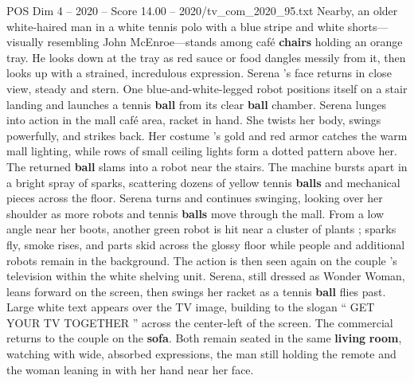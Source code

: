 \begin{textsample}{POS Dim 4 – 2020 – Score 14.00 – 2020/tv\_com\_2020\_95.txt}
Nearby, an older white-haired man in a white tennis polo with a blue stripe and white shorts—visually resembling John McEnroe—stands among café \textbf{chairs} holding an orange tray.
He looks down at the tray as red sauce or food dangles messily from it, then looks up with a strained, incredulous expression.
Serena ’s face returns in close view, steady and stern.
One blue-and-white-legged robot positions itself on a stair landing and launches a tennis \textbf{ball} from its clear \textbf{ball} chamber.
Serena lunges into action in the mall café area, racket in hand.
She twists her body, swings powerfully, and strikes back.
Her costume ’s gold and red armor catches the warm mall lighting, while rows of small ceiling lights form a dotted pattern above her.
The returned \textbf{ball} slams into a robot near the stairs.
The machine bursts apart in a bright spray of sparks, scattering dozens of yellow tennis \textbf{balls} and mechanical pieces across the floor.
Serena turns and continues swinging, looking over her shoulder as more robots and tennis \textbf{balls} move through the mall.
From a low angle near her boots, another green robot is hit near a cluster of plants ; sparks fly, smoke rises, and parts skid across the glossy floor while people and additional robots remain in the background.
The action is then seen again on the couple ’s television within the white shelving unit.
Serena, still dressed as Wonder Woman, leans forward on the screen, then swings her racket as a tennis \textbf{ball} flies past.
Large white text appears over the TV image, building to the slogan “ GET YOUR TV TOGETHER ” across the center-left of the screen.
The commercial returns to the couple on the \textbf{sofa}.
Both remain seated in the same \textbf{living} \textbf{room}, watching with wide, absorbed expressions, the man still holding the remote and the woman leaning in with her hand near her face.

\end{textsample}
